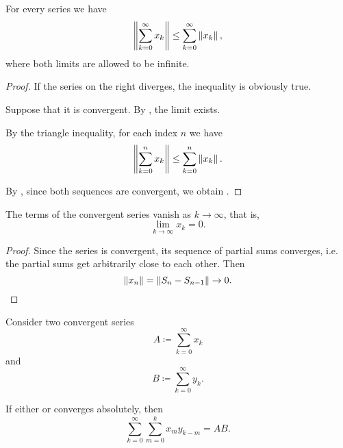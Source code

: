 \begin{proposition}\label{thm:infinitary_triangle_inequality}
  For every series  we have
  \begin{equation}\label{thm:infinitary_triangle_inequality/inequality}
    \left\Vert \sum_{k=0}^\infty x_k \right\Vert \leq \sum_{k=0}^\infty \left\Vert x_k \right\Vert,
  \end{equation}
  where both limits are allowed to be infinite.
\end{proposition}
\begin{proof}
  If the series on the right diverges, the inequality is obviously true.

  Suppose that it is convergent. By , the limit
   exists.

  By the triangle inequality, for each index \( n \) we have
  \begin{equation*}
    \left\Vert \sum_{k=0}^n x_k \right\Vert \leq \sum_{k=0}^n \left\Vert x_k \right\Vert.
  \end{equation*}

  By , since both sequences are convergent, we obtain .
\end{proof}

\begin{proposition}\label{thm:convergent_series_terms_vanish}
  The terms of the convergent series  vanish as \( k \to \infty \), that is,
  \begin{equation*}
    \lim_{k \to \infty} x_k = 0.
  \end{equation*}
\end{proposition}
\begin{proof}
  Since the series is convergent, its sequence of partial sums converges, i.e. the partial sums get arbitrarily close to each other. Then
  \begin{equation*}
    \left\Vert x_n \right\Vert = \left\Vert S_n - S_{n-1} \right\Vert \to 0.
  \end{equation*}
\end{proof}

\begin{theorem}\label{thm:product_of_series_convergence}
  Consider two convergent series
  \begin{equation}\label{thm:product_of_series_convergence/a}
    A \coloneqq \sum_{k=0}^\infty x_k
  \end{equation}
  and
  \begin{equation}\label{thm:product_of_series_convergence/b}
    B \coloneqq \sum_{k=0}^\infty y_k.
  \end{equation}

  If either  or  converges absolutely, then
  \begin{equation}\label{thm:product_of_series_convergence/prod}
    \sum_{k=0}^\infty \sum_{m=0}^k x_m y_{k-m} = AB.
  \end{equation}
\end{theorem}

